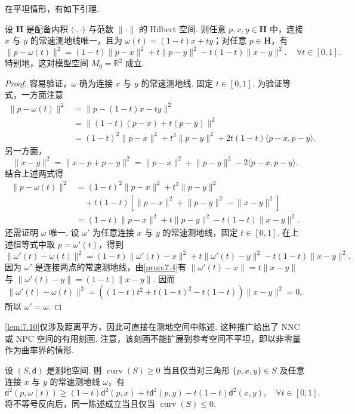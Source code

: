 在平坦情形，有如下引理.
\begin{lemma}\label{lem:7.10}
设 $\mathbf H$ 是配备内积 $\langle\cdot,\cdot\rangle$ 与范数 $\lVert\cdot\rVert$ 的 Hilbert 空间. 则任意 $p,x,y\in\mathbf H$ 中，连接 $x$ 与 $y$ 的常速测地线唯一，且为 $\omega(t)=(1-t)x+ty$；对任意 $p\in\mathbf H$，有
$$\lVert p-\omega(t)\rVert^2=(1-t)\lVert p-x\rVert^2+t\lVert p-y\rVert^2-t(1-t)\lVert x-y\rVert^2,\quad\forall t\in[0,1].$$
特别地，这对模型空间 $M_0=\mathbb R^2$ 成立.
\end{lemma}
\begin{proof}
容易验证，$\omega$ 确为连接 $x$ 与 $y$ 的常速测地线. 固定 $t\in[0,1]$. 为验证等式，一方面注意
$$\begin{aligned}
\lVert p-\omega(t)\rVert^2
&=\lVert p-(1-t)x-ty\rVert^2\\
&=\lVert(1-t)(p-x)+t(p-y)\rVert^2\\
&=(1-t)^2\lVert p-x\rVert^2+t^2\lVert p-y\rVert^2+2t(1-t)\langle p-x,p-y\rangle.
\end{aligned}$$
另一方面，
$$\lVert x-y\rVert^2=\lVert x-p+p-y\rVert^2
=\lVert p-x\rVert^2+\lVert p-y\rVert^2-2\langle p-x,p-y\rangle.$$
结合上述两式得
$$\begin{aligned}
\lVert p-\omega(t)\rVert^2
&=(1-t)^2\lVert p-x\rVert^2+t^2\lVert p-y\rVert^2\\
&\quad+t(1-t)[\lVert p-x\rVert^2+\lVert p-y\rVert^2-\lVert x-y\rVert^2]\\
&=(1-t)\lVert p-x\rVert^2+t\lVert p-y\rVert^2-t(1-t)\lVert x-y\rVert^2.
\end{aligned}$$
还需证明 $\omega$ 唯一. 设 $\omega'$ 为任意连接 $x$ 与 $y$ 的常速测地线，固定 $t\in[0,1]$. 在上述恒等式中取 $p=\omega'(t)$，得到
$$\lVert\omega'(t)-\omega(t)\rVert^2
=(1-t)\lVert\omega'(t)-x\rVert^2+t\lVert\omega'(t)-y\rVert^2-t(1-t)\lVert x-y\rVert^2.$$
因为 $\omega'$ 是连接两点的常速测地线，由\autoref{prop:7.4}有 $\lVert\omega'(t)-x\rVert=t\lVert x-y\rVert$ 与 $\lVert\omega'(t)-y\rVert=(1-t)\lVert x-y\rVert$. 因而
$$\lVert\omega'(t)-\omega(t)\rVert^2
=((1-t)t^2+t(1-t)^2-t(1-t))\lVert x-y\rVert^2=0,$$
所以 $\omega'=\omega$.
\end{proof}
\autoref{lem:7.10}仅涉及距离平方，因此可直接在测地空间中陈述. 这种推广给出了 NNC 或 NPC 空间的有用刻画. 注意，该刻画不能扩展到参考空间不平坦，即以非零量作为曲率界的情形.
\begin{proposition}\label{prop:7.11}
设 $(S,\mathsf d)$ 是测地空间. 则 $\operatorname{curv}(S)\ge0$ 当且仅当对三角形 $\{p,x,y\}\in S$ 及任意连接 $x$ 与 $y$ 的常速测地线 $\omega$，有
\begin{equation}\label{eq:7.10}
\mathsf d^2(p,\omega(t))\ge(1-t)\mathsf d^2(p,x)+t\mathsf d^2(p,y)-t(1-t)\mathsf d^2(x,y),\quad\forall t\in[0,1].
\end{equation}
将不等号反向后，同一陈述成立当且仅当 $\operatorname{curv}(S)\le0$.
\end{proposition}
